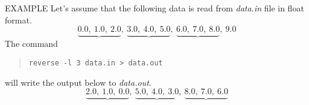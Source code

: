\begin{options}
\end{options}

\begin{qsection}{EXAMPLE}
Let's assume that the following data
is read from {\em data.in} file in float format.
\begin{displaymath}
 \underbrace{0.0, ~1.0, ~2.0}, ~
 \underbrace{3.0, ~4.0, ~5.0}, ~
 \underbrace{6.0, ~7.0, ~8.0}, ~9.0
\end{displaymath}
The command
\begin{quote}
\verb!reverse -l 3 data.in > data.out!
\end{quote}
will write the output below to {\em data.out}.
\begin{displaymath}
 \underbrace{2.0, ~1.0, ~0.0}, ~
 \underbrace{5.0, ~4.0, ~3.0}, ~
 \underbrace{8.0, ~7.0, ~6.0}
\end{displaymath}
\end{qsection}
